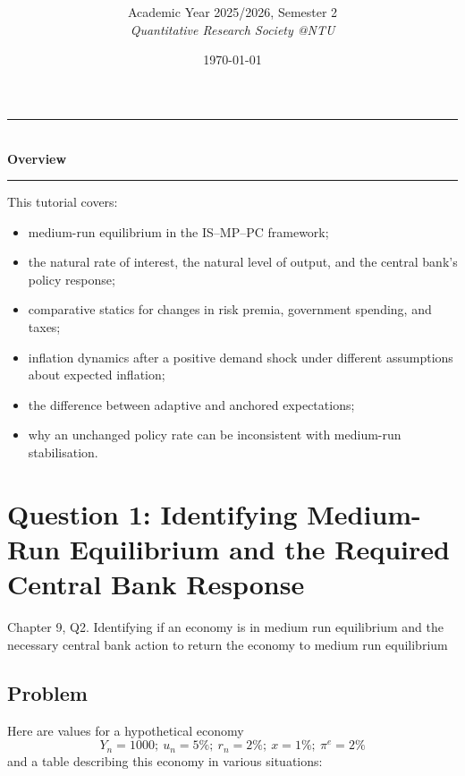 \documentclass[12pt]{article}
\title{
\CourseCode \CourseName \\[0.3em]
\large \DocType
}
\author{
  Academic Year 2025/2026, Semester 2 \\[0.25em]
  \textit{Quantitative Research Society @NTU}
}
\date{\today}
\begin{document}
\maketitle
\thispagestyle{plainfirst}
\pagestyle{main}
\bigskip

\begin{center}
  \rule{0.8\textwidth}{0.4pt}\\[4pt]
  \textbf{Overview}\\[2pt]
  \rule{0.8\textwidth}{0.4pt}
\end{center}

\noindent
This tutorial covers:
\begin{itemize}[leftmargin=*]
  \item medium-run equilibrium in the IS--MP--PC framework;
  \item the natural rate of interest, the natural level of output, and the central bank's policy response;
  \item comparative statics for changes in risk premia, government spending, and taxes;
  \item inflation dynamics after a positive demand shock under different assumptions about expected inflation;
  \item the difference between adaptive and anchored expectations;
  \item why an unchanged policy rate can be inconsistent with medium-run stabilisation.
\end{itemize}

\bigskip

\newpage
\tableofcontents

\newpage
\section{Question 1: Identifying Medium-Run Equilibrium and the Required Central Bank Response}

\noindent
Chapter 9, Q2. Identifying if an economy is in medium run equilibrium and the necessary central bank action to return the economy to medium run equilibrium

\subsection{Problem}
Here are values for a hypothetical economy
\[
Y_n=1000;\ u_n=5\%;\ r_n=2\%;\ x=1\%;\ \pi^e=2\%
\]
and a table describing this economy in various situations:
\end{document}
